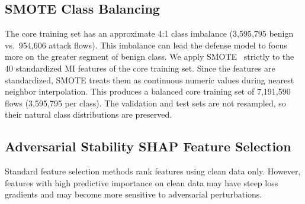 \documentclass[conference]{IEEEtran}
\begin{document}
\subsection{SMOTE Class Balancing}
The core training set has an approximate 4:1 class imbalance (3,595,795 benign vs.\ 954,606 attack flows). This imbalance can lead the defense model to focus more on the greater segment of benign class. We apply SMOTE~\cite{ref15} strictly to the 40 standardized MI features of the core training set. Since the features are standardized, SMOTE treats them as continuous numeric values during nearest neighbor interpolation. This produces a balanced core training set of 7,191,590 flows (3,595,795 per class). The validation and test sets are not resampled, so their natural class distributions are preserved.

\subsection{Adversarial Stability SHAP Feature Selection}
Standard feature selection methods rank features using clean data only. However, features with high predictive importance on clean data may have steep loss gradients and may become more sensitive to adversarial perturbations.
\end{document}

